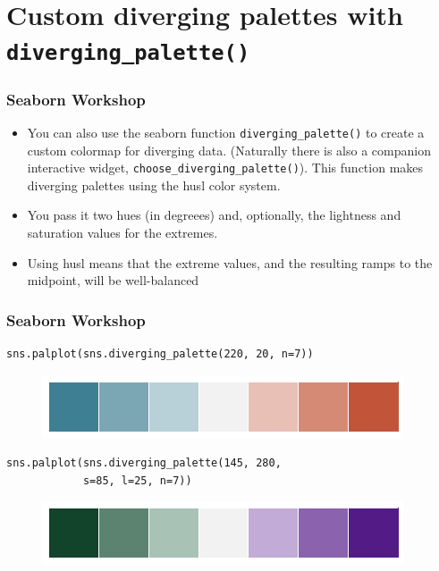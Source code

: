 \documentclass{beamer}
\begin{document}
\section{Custom diverging palettes with \texttt{diverging\_palette()}}
\begin{frame}[fragile]
\frametitle{Seaborn Workshop}
\large

\begin{itemize}
\item You can also use the seaborn function \texttt{diverging\_palette()} to create a custom colormap for diverging data. (Naturally there is also a companion interactive widget, \texttt{choose\_diverging\_palette()}). This function makes diverging palettes using the husl color system. 
\item You pass it two hues (in degreees) and, optionally, the lightness and saturation values for the extremes. 
\item Using husl means that the extreme values, and the resulting ramps to the midpoint, will be well-balanced

\end{itemize}
\end{frame}
\begin{frame}[fragile]
	\frametitle{Seaborn Workshop}
	\large
	\begin{verbatim}
sns.palplot(sns.diverging_palette(220, 20, n=7))
	\end{verbatim}

\begin{figure}
\centering
\includegraphics[width=0.7\linewidth]{images/color_palettes_59_0}
\end{figure}



\begin{verbatim}
sns.palplot(sns.diverging_palette(145, 280, 
            s=85, l=25, n=7))
\end{verbatim}
	
\begin{figure}
\centering
\includegraphics[width=0.7\linewidth]{images/color_palettes_60_0}
\end{figure}
\end{frame}
\end{document}
